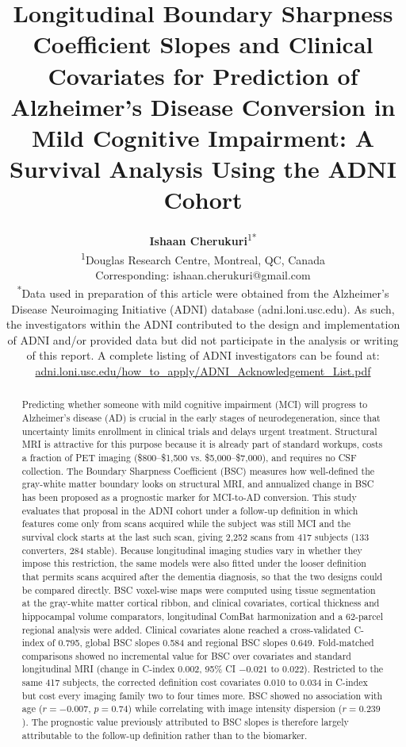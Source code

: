 \documentclass[blue]{ludusofficial}  %
\title{Longitudinal Boundary Sharpness Coefficient Slopes and Clinical Covariates for Prediction of Alzheimer's Disease Conversion in Mild Cognitive Impairment: A Survival Analysis Using the ADNI Cohort}
\author{%
    \textbf{Ishaan Cherukuri}\textsuperscript{1}\textsuperscript{*}\\[0.2cm]
    \small\textsuperscript{1}Douglas Research Centre, Montreal, QC, Canada\\
    \small Corresponding: ishaan.cherukuri@gmail.com\\[0.4cm]
    \small\textsuperscript{*}Data used in preparation of this article were obtained from the Alzheimer's Disease Neuroimaging Initiative (ADNI) database (adni.loni.usc.edu). As such, the investigators within the ADNI contributed to the design and implementation of ADNI and/or provided data but did not participate in the analysis or writing of this report. A complete listing of ADNI investigators can be found at: \href{http://adni.loni.usc.edu/wp-content/uploads/how_to_apply/ADNI_Acknowledgement_List.pdf}{adni.loni.usc.edu/how\_to\_apply/ADNI\_Acknowledgement\_List.pdf}
}
\begin{document}
\begin{abstract}
Predicting whether someone with mild cognitive impairment (MCI) will progress to Alzheimer's disease (AD) is crucial in the early stages of neurodegeneration, since that uncertainty limits enrollment in clinical trials and delays urgent treatment. Structural MRI is attractive for this purpose because it is already part of standard workups, costs a fraction of PET imaging (\$800--\$1,500 vs. \$5,000--\$7,000), and requires no CSF collection. The Boundary Sharpness Coefficient (BSC)\cite{olafson2021bsc} measures how well-defined the gray-white matter boundary looks on structural MRI, and annualized change in BSC has been proposed as a prognostic marker for MCI-to-AD conversion. This study evaluates that proposal in the ADNI cohort under a follow-up definition in which features come only from scans acquired while the subject was still MCI and the survival clock starts at the last such scan, giving 2,252 scans from 417 subjects (133 converters, 284 stable). Because longitudinal imaging studies vary in whether they impose this restriction, the same models were also fitted under the looser definition that permits scans acquired after the dementia diagnosis, so that the two designs could be compared directly. BSC voxel-wise maps were computed using tissue segmentation at the gray-white matter cortical ribbon, and clinical covariates, cortical thickness and hippocampal volume comparators, longitudinal ComBat harmonization and a 62-parcel regional analysis were added. Clinical covariates alone reached a cross-validated C-index of 0.795, global BSC slopes 0.584 and regional BSC slopes 0.649. Fold-matched comparisons showed no incremental value for BSC over covariates and standard longitudinal MRI (change in C-index 0.002, 95\% CI $-0.021$ to $0.022$). Restricted to the same 417 subjects, the corrected definition cost covariates 0.010 to 0.034 in C-index but cost every imaging family two to four times more. BSC showed no association with age ($r=-0.007$, $p=0.74$) while correlating with image intensity dispersion ($r=0.239$). The prognostic value previously attributed to BSC slopes is therefore largely attributable to the follow-up definition rather than to the biomarker.
\end{abstract}


\end{document}
